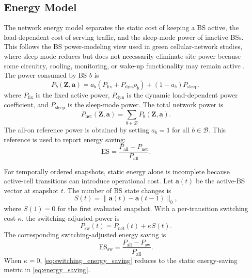 \documentclass[journal]{IEEEtran}
\begin{document}
\subsection{Energy Model}
The network energy model separates the static cost of keeping a BS active, the
load-dependent cost of serving traffic, and the sleep-mode power of inactive
BSs. This follows the BS power-modeling view used in green cellular-network
studies, where sleep mode reduces but does not necessarily eliminate site power
because some circuitry, cooling, monitoring, or wake-up functionality may remain
active \cite{ghazzai2017green,oh2013dynamic}. The power consumed by BS $b$ is
\begin{equation}
    P_b(\mathbf{Z},\mathbf{a}) =
    a_b\left(P_{\mathrm{fix}} + P_{\mathrm{dyn}}\rho_b\right)
    +(1-a_b)P_{\mathrm{sleep}},
    \label{eq:bs_power}
\end{equation}
where $P_{\mathrm{fix}}$ is the fixed active power, $P_{\mathrm{dyn}}$ is the
dynamic load-dependent power coefficient, and $P_{\mathrm{sleep}}$ is the
sleep-mode power. The total network power is
\begin{equation}
    P_{\mathrm{net}}(\mathbf{Z},\mathbf{a}) =
    \sum_{b\in\mathcal{B}}P_b(\mathbf{Z},\mathbf{a}).
    \label{eq:network_power}
\end{equation}
The all-on reference power is obtained by setting $a_b=1$ for all
$b\in\mathcal{B}$. This reference is used to report energy saving:
\begin{equation}
    \mathrm{ES} =
    \frac{P_{\mathrm{all}}-P_{\mathrm{net}}}{P_{\mathrm{all}}}.
    \label{eq:energy_saving}
\end{equation}

For temporally ordered snapshots, static energy alone is incomplete because
active-cell transitions can introduce operational cost. Let $\mathbf{a}(t)$ be
the active-BS vector at snapshot $t$. The number of BS state changes is
\begin{equation}
    S(t)=\|\mathbf{a}(t)-\mathbf{a}(t-1)\|_0,
    \label{eq:switch_events}
\end{equation}
where $S(1)=0$ for the first evaluated snapshot. With a per-transition
switching cost $\kappa$, the switching-adjusted power is
\begin{equation}
    P_{\mathrm{sw}}(t)
    =
    P_{\mathrm{net}}(t)+\kappa S(t).
    \label{eq:switching_power}
\end{equation}
The corresponding switching-adjusted energy saving is
\begin{equation}
    \mathrm{ES}_{\mathrm{sw}}
    =
    \frac{P_{\mathrm{all}}-P_{\mathrm{sw}}}{P_{\mathrm{all}}}.
    \label{eq:switching_energy_saving}
\end{equation}
When $\kappa=0$, \eqref{eq:switching_energy_saving} reduces to the static
energy-saving metric in \eqref{eq:energy_saving}.
\end{document}
